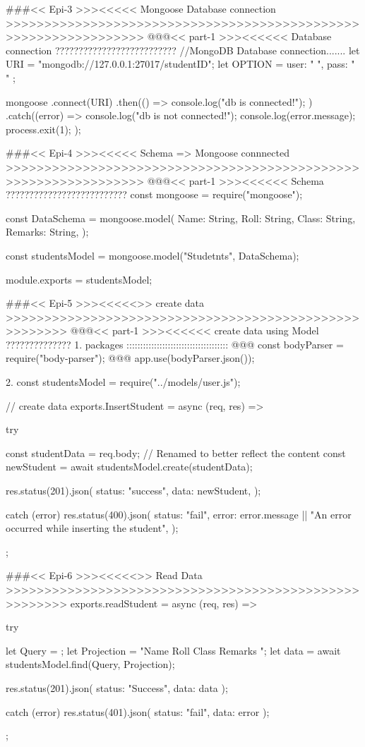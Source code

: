 ###<< Epi-3 >>><<<<< Mongoose Database connection >>>>>>>>>>>>>>>>>>>>>>>>>>>>>>>>>>>>>>>>>>>>>>>>>>>>>>>>>>>>>>>>
@@@<< part-1 >>><<<<<< Database connection ??????????????????????????
//MongoDB Database connection.......
let URI = "mongodb://127.0.0.1:27017/studentID";
let OPTION = { user: " ", pass: " " };

mongoose
  .connect(URI)
  .then(() => {
    console.log("db is connected!");
  })
  .catch((error) => {
    console.log("db is not connected!");
    console.log(error.message);
    process.exit(1);
  });

###<< Epi-4 >>><<<<< Schema => Mongoose connnected >>>>>>>>>>>>>>>>>>>>>>>>>>>>>>>>>>>>>>>>>>>>>>>>>>>>>>>>>>>>>>>>
@@@<< part-1 >>><<<<<< Schema ??????????????????????????
const mongoose = require("mongoose");

const DataSchema = mongoose.model({
  Name: String,
  Roll: String,
  Class: String,
  Remarks: String,
});

const studentsModel = mongoose.model("Studetnts", DataSchema);

module.exports = studentsModel;

###<< Epi-5 >>><<<<<>> create data  >>>>>>>>>>>>>>>>>>>>>>>>>>>>>>>>>>>>>>>>>>>>>>>>>>>>>>
@@@<< part-1 >>><<<<<< create data using Model ??????????????
1. packages :::::::::::::::::::::::::::::::::::::
   @@@ const bodyParser = require("body-parser");
   @@@ app.use(bodyParser.json());

2. const studentsModel = require("../models/user.js");

// create data
exports.InsertStudent = async (req, res) => {
  try {
    const studentData = req.body; // Renamed to better reflect the content
    const newStudent = await studentsModel.create(studentData);

    res.status(201).json({
      status: "success",
      data: newStudent,
    });
  } catch (error) {
    res.status(400).json({
      status: "fail",
      error: error.message || "An error occurred while inserting the student",
    });
  }
};

###<< Epi-6 >>><<<<<>> Read Data  >>>>>>>>>>>>>>>>>>>>>>>>>>>>>>>>>>>>>>>>>>>>>>>>>>>>>>
exports.readStudent = async (req, res) => {
  try {
    let Query = {};
    let Projection = "Name Roll Class Remarks ";
    let data = await studentsModel.find(Query, Projection);

    res.status(201).json({ status: "Success", data: data });
  } catch (error) {
    res.status(401).json({ status: "fail", data: error });
  }
};

